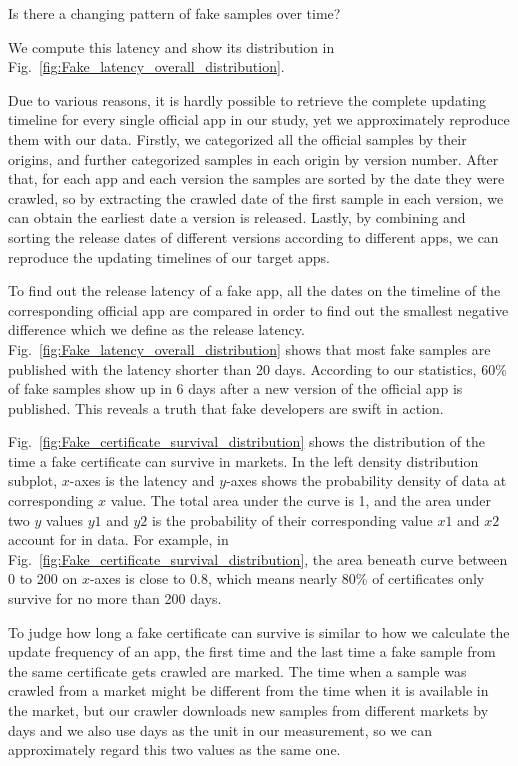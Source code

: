  Is there a changing pattern of fake samples over time?


We compute this latency and show its distribution in Fig.~\ref{fig:Fake_latency_overall_distribution}.

Due to various reasons, it is hardly possible to retrieve the complete updating timeline for every single official app in our study, yet we approximately reproduce them with our data.
Firstly, we categorized all the official samples by their origins, and further categorized samples in each origin by version number.
After that, for each app and each version the samples are sorted by the date they were crawled, so by extracting the crawled date of the first sample in each version, we can obtain the earliest date a version is released.
Lastly, by combining and sorting the release dates of different versions according to different apps, we can reproduce the updating timelines of our target apps.

To find out the release latency of a fake app, all the dates on the timeline of the corresponding official app are compared in order to find out the smallest negative difference which we define as the release latency.
Fig.~\ref{fig:Fake_latency_overall_distribution} shows that most fake samples are published with the latency shorter than 20 days.
According to our statistics, 60\% of fake samples show up in 6 days after a new version of the official app is published.
This reveals a truth that fake developers are swift in action.


 Fig.~\ref{fig:Fake_certificate_survival_distribution} shows the distribution of the time a fake certificate can survive in markets.
In the left density distribution subplot, $x$-axes is the latency and $y$-axes shows the probability density of data at corresponding $x$ value.
The total area under the curve is 1, and the area under two $y$ values $y1$ and $y2$ is the probability of their corresponding value $x1$ and $x2$ account for in data.
For example, in Fig.~\ref{fig:Fake_certificate_survival_distribution}, the area beneath curve between 0 to 200 on $x$-axes is close to 0.8, which means nearly 80\% of certificates only survive for no more than 200 days.

To judge how long a fake certificate can survive is similar to how we calculate the update frequency of an app, the first time and the last time a fake sample from the same certificate gets crawled are marked.
The time when a sample was crawled from a market might be different from the time when it is available in the market, but our crawler downloads new samples from different markets by days and we also use days as the unit in our measurement, so we can approximately regard this two values as the same one.

